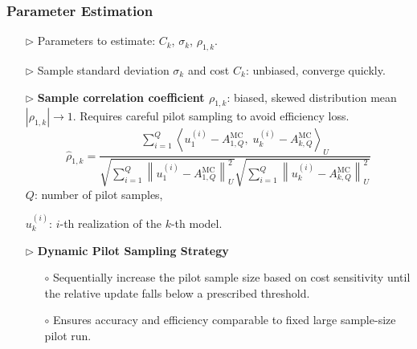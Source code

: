 \documentclass{beamer}
\begin{document}
\begin{frame}[t]
\frametitle{Parameter Estimation}
{\footnotesize
\begin{itemize}[leftmargin=5pt] 
\item[$\triangleright$] Parameters to estimate: $C_k$, $\sigma_k$, $\rho_{1,k}$.
\item[$\triangleright$] Sample standard deviation $\sigma_k$ and cost $C_k$: unbiased, converge quickly.
\item[$\triangleright$] \textcolor{myblue3}{\bf Sample correlation coefficient $\rho_{1,k}$}: biased, skewed distribution mean $|\rho_{1,k}|\rightarrow 1$. Requires careful pilot sampling to avoid efficiency loss.
%
\[
\widehat{\rho}_{1,k} = \frac{\sum_{i=1}^Q\left\langle u_{1}^{(i)} - A_{1,Q}^{\text{MC}},\; u_{k}^{(i)} - A_{k,Q}^{\text{MC}} \right\rangle_U}{\sqrt{\sum_{i=1}^Q \left\|u_{1}^{(i)} - A_{1,Q}^{\text{MC}}\right\|_U^2} \sqrt{\sum_{i=1}^Q \left\|u_{k}^{(i)} - A_{k,Q}^{\text{MC}}\right\|_U^2}}
\]
%
$Q$: number of pilot samples,

$u_k^{(i)}$: $i$-th realization of the $k$-th model.

\item[$\triangleright$] \textcolor{myblue3}{\bf Dynamic Pilot Sampling Strategy}

\begin{itemize}[leftmargin=15pt] 
    \item[$\circ$] Sequentially increase the pilot sample size based on cost sensitivity until the relative update falls below a prescribed threshold.
    \item[$\circ$] Ensures accuracy and efficiency comparable to fixed large sample-size pilot run.
\end{itemize}
\end{itemize}
}
\end{frame}
\end{document}
